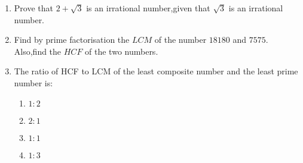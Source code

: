 
\begin{enumerate}

\item Prove that $ 2+\sqrt3 $ is an irrational number,given that $ \sqrt3 $ is an irrational number.

\item Find by prime factorisation the $LCM$ of the number $18180$ and $7575$. Also,find the $HCF$ of the two numbers.

\item The ratio of HCF to LCM of the least composite number and the least prime number is:

	\begin{enumerate}
	\item $1:2$
	\item $2:1$
	\item $1:1$
	\item $1:3$
\end{enumerate}
\end{enumerate}

